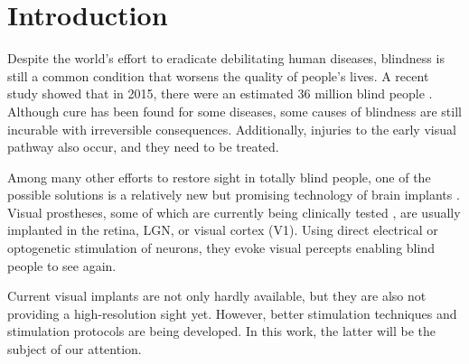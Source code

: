 \chapter*{Introduction}

Despite the world's effort to eradicate debilitating human diseases, blindness is still a common condition that worsens the quality of people's lives. A recent study showed that in 2015, there were an estimated 36 million blind people \citep{ackland2017world}. Although cure has been found for some diseases, some causes of blindness are still incurable with irreversible consequences. Additionally, injuries to the early visual pathway also occur, and they need to be treated.

Among many other efforts to restore sight in totally blind people, one of the possible solutions is a relatively new but promising technology of brain implants \citep{kilgore_2015}. Visual prostheses, some of which are currently being clinically tested \citep{fernandez2021visual}, are usually implanted in the retina, LGN, or visual cortex (V1). Using direct electrical \citep{cogan2008neural} or optogenetic \citep{edward2018towards} stimulation of neurons, they evoke visual percepts enabling blind people to see again.

Current visual implants are not only hardly available, but they are also not providing a high-resolution sight yet. However, better stimulation techniques and stimulation protocols are being developed. In this work, the latter will be the subject of our attention.
